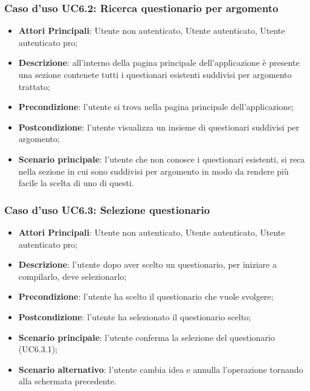 \subsubsection{Caso d'uso UC6.2: Ricerca questionario per argomento}
\begin{itemize}
\item\textbf{Attori Principali}: Utente non autenticato, Utente autenticato, Utente autenticato pro;
\item\textbf{Descrizione}: all'interno della pagina principale dell'applicazione è presente una sezione contenete tutti i questionari esistenti suddivisi per argomento trattato;
\item\textbf{Precondizione}: l'utente si trova nella pagina principale dell'applicazione;
\item\textbf{Postcondizione}: l'utente visualizza un insieme di questionari suddivisi per argomento;
\item\textbf{Scenario principale}: l'utente che non conosce i questionari esistenti, si reca nella sezione in cui sono suddivisi per argomento in modo da rendere più facile la scelta di uno di questi. 
\end{itemize}

\subsubsection{Caso d'uso UC6.3: Selezione questionario}
\begin{itemize}
\item\textbf{Attori Principali}: Utente non autenticato, Utente autenticato, Utente autenticato pro;
\item\textbf{Descrizione}: l'utente dopo aver scelto un questionario, per iniziare a compilarlo, deve selezionarlo;
\item\textbf{Precondizione}: l'utente ha scelto il questionario che vuole svolgere;
\item\textbf{Postcondizione}: l'utente ha selezionato il questionario scelto;
\item\textbf{Scenario principale}: l'utente conferma la selezione del questionario (UC6.3.1);
\item\textbf{Scenario alternativo}: l'utente cambia idea e annulla l'operazione tornando alla schermata precedente.
\end{itemize}

